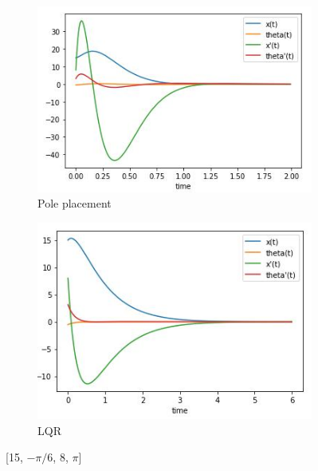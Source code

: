 \documentclass[12pt,letterpaper]{article}
\begin{document}
    \begin{figure}[htb]
        \begin{subfigure}{.5\textwidth}
            \centering
            \includegraphics[width=1\linewidth]{images/output/poles/15-neg_pi_6-8-pi.jpg}
            \caption{Pole placement}
            \label{fig:pole_5}
        \end{subfigure}
        \begin{subfigure}{.5\textwidth}
          \centering
          \includegraphics[width=1\linewidth]{images/output/15-neg_pi_6-8-pi.jpg}
          \caption{LQR}
        \label{fig:lqr_5}
        \end{subfigure}
    \caption{[15, $-\pi / 6$, 8, $\pi$]}
    \end{figure}
\end{document}
